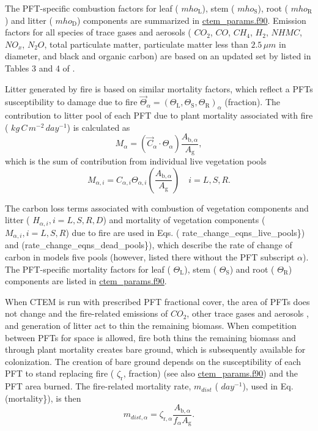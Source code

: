 The P\+F\+T-\/specific combustion factors for leaf ( $mho_\mathrm{L}$), stem ( $mho_{\mathrm{S}}$), root ( $mho_{\mathrm{R}}$) and litter ( $mho_{\mathrm{D}}$) components are summarized in \hyperlink{ctem__params_8f90}{ctem\+\_\+params.\+f90}. Emission factors for all species of trace gases and aerosols ( $CO_2$, $CO$, $CH_4$, $H_2$, $NHMC$, $NO_x$, $N_2O$, total particulate matter, particulate matter less than $2.5\, \mu m$ in diameter, and black and organic carbon) are based on an updated set by \cite{Andreae2001-e04} listed in Tables 3 and 4 of \cite{Li20121c2}.

Litter generated by fire is based on similar mortality factors, which reflect a P\+F\+T\textquotesingle{}s susceptibility to damage due to fire $\vec{\Theta}_{\alpha} = (\Theta_\mathrm{L}, \Theta_\mathrm{S}, \Theta_\mathrm{R})_\alpha$ (fraction). The contribution to litter pool of each P\+F\+T due to plant mortality associated with fire ( $kg\,C\,m^{-2}\,day^{-1}$) is calculated as \[ \label{eqn_using_mort_factors} {M_{\alpha}}= (\vec{C}_\alpha \cdot \Theta_{\alpha} ) \frac{A_{\mathrm{b},\alpha}}{A_\mathrm{g}}, \] which is the sum of contribution from individual live vegetation pools \[ \label{eqn_using_mort_factors_individual} M_{\alpha, i}= C_{\alpha, i} \Theta_{\alpha, i} \left(\frac{A_{\mathrm{b},\alpha}}{A_\mathrm{g}} \right) \quad i={L, S, R}. \]

The carbon loss terms associated with combustion of vegetation components and litter ( $H_{\alpha, i}, i={L, S, R, D}$) and mortality of vegetation components ( $M_{\alpha, i}, i={L, S, R}$) due to fire are used in Eqs. ( rate\+\_\+change\+\_\+eqns\+\_\+live\+\_\+pools\}) and (rate\+\_\+change\+\_\+eqns\+\_\+dead\+\_\+pools\}), which describe the rate of change of carbon in model\textquotesingle{}s five pools (however, listed there without the P\+F\+T subscript $\alpha$). The P\+F\+T-\/specific mortality factors for leaf ( $\Theta_\mathrm{L}$), stem ( $\Theta_{\mathrm{S}}$) and root ( $\Theta_\mathrm{R}$) components are listed in \hyperlink{ctem__params_8f90}{ctem\+\_\+params.\+f90}.

When C\+T\+E\+M is run with prescribed P\+F\+T fractional cover, the area of P\+F\+Ts does not change and the fire-\/related emissions of $CO_2$, other trace gases and aerosols , and generation of litter act to thin the remaining biomass. When competition between P\+F\+Ts for space is allowed, fire both thins the remaining biomass and through plant mortality creates bare ground, which is subsequently available for colonization. The creation of bare ground depends on the susceptibility of each P\+F\+T to stand replacing fire ( $\zeta_\mathrm{r}$, fraction) (see also \hyperlink{ctem__params_8f90}{ctem\+\_\+params.\+f90}) and the P\+F\+T area burned. The fire-\/related mortality rate, $m_{dist}$ ( $day^{-1}$), used in Eq. (mortality\}), is then \[ \label{m_dist} m_{dist,\alpha} = \zeta_{\mathrm{r},\alpha} \frac{A_{\mathrm{b},\alpha}}{f_\alpha A_\mathrm{g}}. \]

